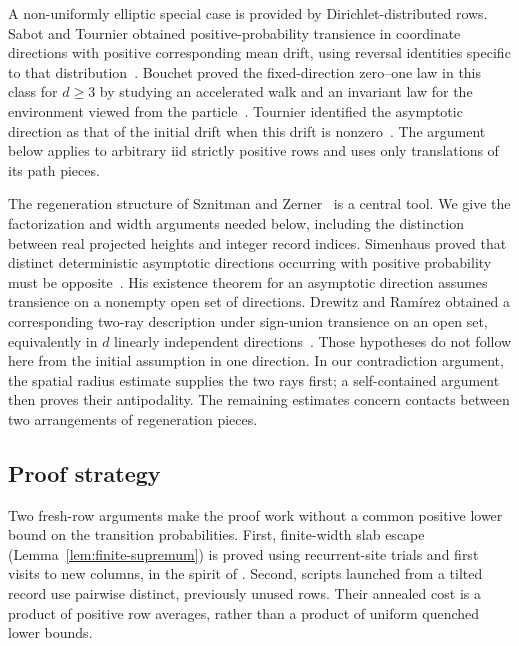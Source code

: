 A non-uniformly elliptic special case is provided by Dirichlet-distributed
rows. Sabot and Tournier obtained positive-probability transience in coordinate
directions with positive corresponding mean drift, using reversal identities
specific to that distribution~\cite[Theorem~1]{SabotTournier2011}.
Bouchet proved the fixed-direction zero--one law in this class for $d\ge3$
by studying an accelerated walk and an invariant law for the environment
viewed from the particle~\cite[Corollary~4]{Bouchet2013}. Tournier identified
the asymptotic direction as that of the initial drift when this drift is
nonzero~\cite[Corollary~1]{Tournier2015}. The argument below applies to arbitrary iid
strictly positive rows and uses only translations of its path pieces.

The regeneration structure of Sznitman and Zerner~\cite{SznitmanZerner1999}
is a central tool. We give the factorization and width arguments needed
below, including the distinction between real projected heights and
integer record indices. Simenhaus proved that distinct deterministic
asymptotic directions occurring with positive probability must be
opposite~\cite[Proposition~1]{Simenhaus2007}. His existence theorem for
an asymptotic direction assumes transience on a nonempty open set of
directions. Drewitz and Ram\'{i}rez obtained a corresponding two-ray
description under sign-union transience on an open set, equivalently in
$d$ linearly independent directions~\cite[Theorem~1.8]{DrewitzRamirez2010}.
Those hypotheses do not follow here from the initial assumption in one
direction. In our contradiction argument, the spatial radius estimate
supplies the two rays first; a self-contained argument then proves
their antipodality. The remaining estimates concern contacts between
two arrangements of regeneration pieces.

\subsection{Proof strategy}

Two fresh-row arguments make the proof work without a common positive
lower bound on the transition probabilities. First, finite-width slab escape
(Lemma~\ref{lem:finite-supremum}) is
proved using recurrent-site trials and first visits to new columns,
in the spirit of \cite[Lemma~4]{ZernerMerkl2001}. Second, scripts launched
from a tilted record use pairwise distinct, previously unused rows.
Their annealed cost is a product of positive row averages, rather than
a product of uniform quenched lower bounds.

